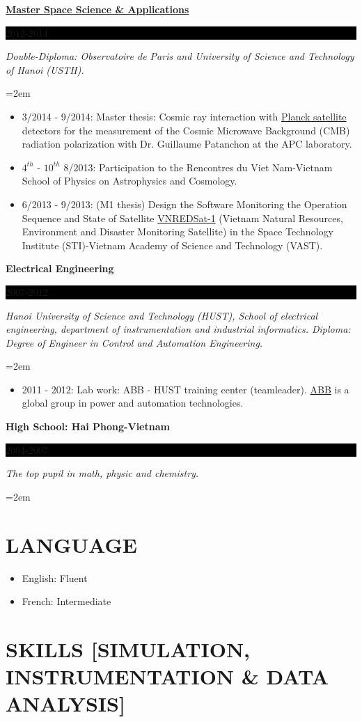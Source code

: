 \documentclass[paper=a4,fontsize=11pt]{scrartcl} %
\newcommand{\sepspace}{\vspace*{1em}}		%
\newcommand{\NewPart}[1]{\section*{\uppercase{#1}}}
\newcommand{\EducationEntry}[4]{
		\noindent \textbf{#1} \hfill      %
		\colorbox{Black}{%
			\parbox{6em}{%
			\hfill\color{White}#2}} \par  %
		\noindent \textit{#3} \par        %
		\noindent\hangindent=2em\hangafter=0 \small #4 %
		\normalsize \par}
\begin{document}
\EducationEntry{\href{https://space.usth.edu.vn/}{Master Space Science \& Applications} }{2012-2014}{Double-Diploma: Observatoire de Paris and University of Science and Technology of Hanoi (USTH).}{
\begin{itemize}
    \item 3/2014 - 9/2014: Master thesis: Cosmic ray interaction with \href{https://www.cosmos.esa.int/web/planck/home}{Planck satellite} detectors for the measurement of the Cosmic Microwave Background (CMB) radiation polarization with Dr. Guillaume Patanchon at the APC laboratory.
    \item $4^{th}$ - $10^{th}$ 8/2013: Participation to the Rencontres du Viet Nam-Vietnam School of Physics on
Astrophysics and Cosmology.
    \item 6/2013 - 9/2013: (M1 thesis) Design the Software Monitoring the Operation Sequence and State of Satellite \href{https://directory.eoportal.org/web/eoportal/satellite-missions/v-w-x-y-z/vnredsat-1}{VNREDSat-1} (Vietnam Natural Resources, Environment and Disaster Monitoring Satellite) in the Space Technology Institute (STI)-Vietnam Academy of Science and Technology (VAST).
\end{itemize}
}
\sepspace

\EducationEntry{Electrical Engineering}{2007-2012}{Hanoi University of Science and Technology (HUST), School of electrical engineering, department of instrumentation and industrial informatics. Diploma: Degree of Engineer in Control and Automation Engineering.}{
\begin{itemize}
    \item 2011 - 2012: Lab work: ABB - HUST training center (teamleader). \href{https://en.wikipedia.org/wiki/ABB_Group}{ABB} is a global group in power and automation technologies.
\end{itemize}
}
\sepspace
\EducationEntry{High School: Hai Phong-Vietnam }{2004-2007}{The top pupil in math, physic and chemistry.}{}

\NewPart{LANGUAGE}{}

\begin{itemize}
    \item English: Fluent
    \item French: Intermediate
\end{itemize}

\NewPart{SKILLS [Simulation, Instrumentation \& Data analysis]}{}
\end{document}
